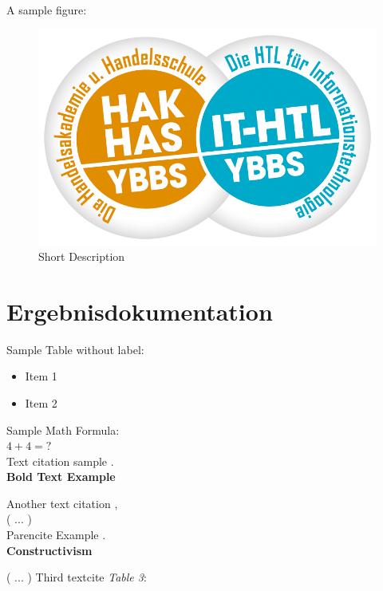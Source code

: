 A sample figure: \\

\begin{figure}[H]
	\centering
	\includegraphics[width=0.5\linewidth]{images/SZ-Ybbs-Logo}
	\caption[Short Description]{Short Description}
	\label{fig:sz-ybbs-logo}
\end{figure}


\chapter{Ergebnisdokumentation}

Sample Table without label:

\begin{itemize}
	\item 	Item 1
	\item 	Item 2
\end{itemize}

Sample Math Formula: \\

$4 + 4 = ?$ \\


Text citation sample
\textcite{Vigna}. \\


\textbf{Bold Text Example}

Another text citation \textcite{OWASP},  \\

( ...  ) \\

Parencite Example \parencite{embroker}. \\

\textbf{Constructivism}

( ...  ) Third textcite \textcite{DeciRyan} \emph{Table 3}:

